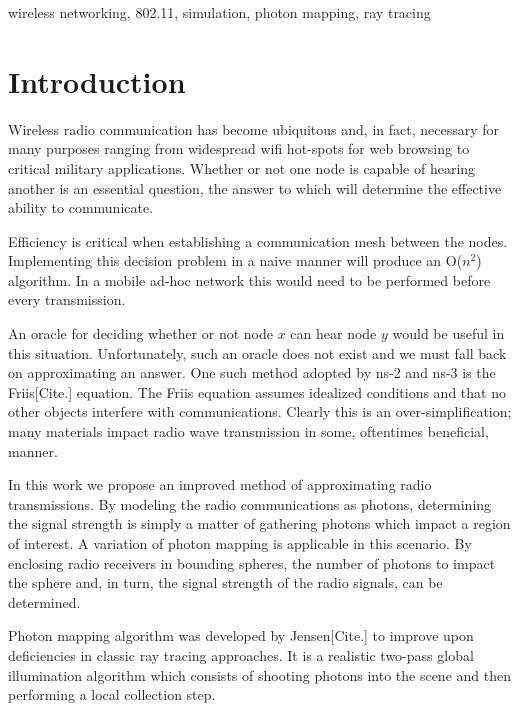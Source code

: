 \documentclass[%
        final,
        notitlepage,
        narroweqnarray,
        inline,
        twoside,
        ]{ieee}
\begin{document}
\vspace{5mm}
\begin{keywords}
wireless networking, 802.11, simulation, photon mapping, ray tracing
\end{keywords}

\section{Introduction}

Wireless radio communication has become ubiquitous and, in fact, necessary for 
many purposes ranging from widespread wifi hot-spots for web browsing to 
critical military applications.  Whether or not one node is capable of 
hearing another is an essential question, the answer to which will 
determine the effective ability to communicate.

Efficiency is critical when establishing a communication mesh between the
nodes. Implementing this decision problem
in a naive manner will produce an O($n^2$) algorithm.  In a mobile ad-hoc
network this would need to be performed before every transmission.

An oracle for deciding whether or not node $x$ can hear node $y$ would be useful 
in this situation.  Unfortunately, such an oracle does not exist and we must 
fall back on approximating an answer.  One such method adopted by ns-2 and 
ns-3 is the Friis[Cite.] equation.  The Friis equation assumes idealized 
conditions and that no other objects interfere with communications.  Clearly 
this is an over-simplification; many materials impact radio wave transmission 
in some, oftentimes beneficial, manner.

In this work we propose an improved method of approximating radio 
transmissions.  By modeling the radio communications as photons, determining 
the signal strength is simply a matter of gathering photons which impact a 
region of interest.  A variation of photon mapping is applicable in this
scenario.  By enclosing radio receivers in bounding spheres, the number of
photons to impact the sphere and, in turn, the signal strength of the radio
signals, can be determined.

Photon mapping algorithm was developed by Jensen[Cite.] 
to improve upon deficiencies in classic ray tracing approaches.  It is a
realistic two-pass global illumination algorithm which consists of shooting
photons into the scene and then performing a local collection step.
\end{document}

